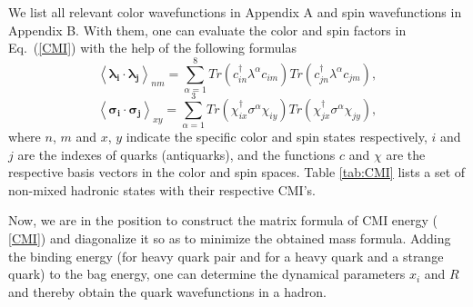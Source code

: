 \documentclass[12pt,onecolumn,floatfix,nofootinbib]{revtex4}
\begin{document}
We list all relevant color wavefunctions in Appendix A and spin
wavefunctions in Appendix B. With them, one can evaluate the color and spin
factors in Eq.~(\ref{CMI}) with the help of the following formulas
\begin{equation}  \label{colorfc}
{\left\langle \boldsymbol{\lambda_{i}}\cdot \boldsymbol{\lambda_{j}}
\right\rangle}_{nm}= \sum_{\alpha=1}^{8}
Tr\left(c_{in}^{\dagger}\lambda^{\alpha}c_{im}\right)
Tr\left(c_{jn}^{\dagger}\lambda^{\alpha}c_{jm}\right),
\end{equation}
\begin{equation}  \label{spinfc}
{\left\langle \boldsymbol{\sigma_{i}}\cdot \boldsymbol{\sigma_{j}}
\right\rangle}_{xy}= \sum_{\alpha=1}^{3}
Tr\left(\chi_{ix}^{\dagger}\sigma^{\alpha}\chi_{iy}\right)
Tr\left(\chi_{jx}^{\dagger}\sigma^{\alpha}\chi_{jy}\right),
\end{equation}
where $n$, $m$ and $x$, $y$ indicate the specific color and spin states
respectively, $i$ and $j$ are the indexes of quarks (antiquarks), and the
functions $c$ and $\chi$ are the respective basis vectors in the color and
spin spaces. Table \ref{tab:CMI} lists a set of non-mixed hadronic states
with their respective CMI's.

Now, we are in the position to construct the matrix formula of CMI energy (%
\ref{CMI}) and diagonalize it so as to minimize the obtained mass formula.
Adding the binding energy (for heavy quark pair and for a heavy quark and a
strange quark) to the bag energy, one can determine the dynamical parameters
$x_{i}$ and $R$ and thereby obtain the quark wavefunctions in a hadron.
\end{document}
